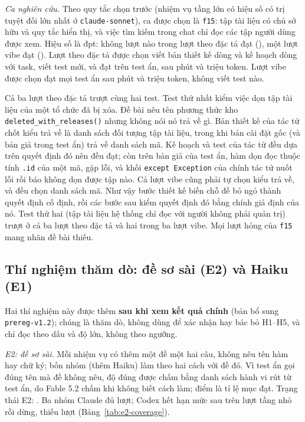 \textit{Ca nghiên cứu.} Theo quy tắc chọn trước (nhiệm vụ tầng lớn có hiệu số có trị tuyệt đối lớn nhất ở
\texttt{claude-sonnet}), ca được chọn là \texttt{f15}: tập tài liệu có chủ sở hữu và quy tắc hiển thị,
và việc tìm kiếm trong chat chỉ đọc các tập người dùng được xem. Hiệu số là \NumResCaseDiffPp{} đpt:
không lượt nào trong \NumResCaseReps{} lượt theo đặc tả đạt (\NumResCaseSpecPassed{}), một lượt vibe
đạt (\NumResCaseVibePassed{}). Lượt theo đặc tả được chọn viết bản thiết kế \NumResCaseDesignLines{}
dòng và kế hoạch \NumResCasePlanLines{} dòng với \NumResCasePlanTasks{} task, viết \NumResCaseSpecTests{}
test mới, và đạt \NumResCaseSpecHidden{} trên \NumResCaseHiddenTotal{} test ẩn, sau
\NumResCaseSpecMin{} phút và \NumResCaseSpecTokensM{} triệu token. Lượt vibe được chọn đạt mọi test ẩn
sau \NumResCaseVibeMin{} phút và \NumResCaseVibeTokensM{} triệu token, không viết test nào.

Cả ba lượt theo đặc tả trượt cùng hai test. Test thứ nhất kiểm việc dọn tập tài liệu của một tổ chức đã
bị xóa. Đề bài nêu tên phương thức kho \texttt{deleted\_with\_releases()} nhưng không nói nó trả về gì.
Bản thiết kế của tác tử chốt kiểu trả về là danh sách đối tượng tập tài liệu, trong khi bản cài đặt gốc
(và bản giả trong test ẩn) trả về danh sách mã. Kế hoạch và test của tác tử đều dựa trên quyết định đó
nên đều đạt; còn trên bản giả của test ẩn, hàm dọn đọc thuộc tính \texttt{.id} của một mã, gặp lỗi, và
khối \texttt{except Exception} của chính tác tử nuốt lỗi rồi báo không dọn được tập nào. Cả \NumResCaseReps{} lượt vibe
cũng phải tự chọn kiểu trả về, và đều chọn danh sách mã. Như vậy bước thiết kế biến chỗ đề bỏ ngỏ thành
quyết định cố định, rồi các bước sau kiểm quyết định đó bằng chính giả định của nó. Test thứ hai (tập tài
liệu hệ thống chỉ đọc với người không phải quản trị) trượt ở cả ba lượt theo đặc tả và hai trong ba lượt
vibe. Mọi lượt hỏng của \texttt{f15} mang nhãn đề bài thiếu.

\subsection{Thí nghiệm thăm dò: đề sơ sài (E2) và Haiku (E1)}\label{sec:explore}

Hai thí nghiệm này được thêm \textbf{sau khi xem kết quả chính} (bản bổ sung
\texttt{prereg-v1.2}); chúng là thăm dò, không dùng để xác nhận hay bác bỏ H1--H5, và chỉ đọc theo dấu và
độ lớn, không theo ngưỡng.

\textit{E2: đề sơ sài.} Mỗi nhiệm vụ có thêm một đề một hai câu, không nêu tên hàm hay chữ ký; bốn nhóm
(thêm Haiku) làm theo hai cách với đề đó. Vì test ẩn gọi đúng tên mà đề không nêu, độ đúng được chấm bằng
danh sách hành vi rút từ test ẩn, do Fable 5.2 chấm khi không biết cách làm; điểm là tỉ lệ mục đạt.
Trạng thái E2: \textbf{\NumETwoStatus{}}. Ba nhóm Claude đủ \NumETwoClaudeBriefJudged{} lượt; Codex hết hạn mức sau \NumETwoCodexSmallJudged{} trên \NumETwoCodexSmallExpected{} lượt tầng nhỏ rồi dừng, thiếu \NumETwoStoppedUnits{} lượt (Bảng~\ref{tab:e2-coverage}).

